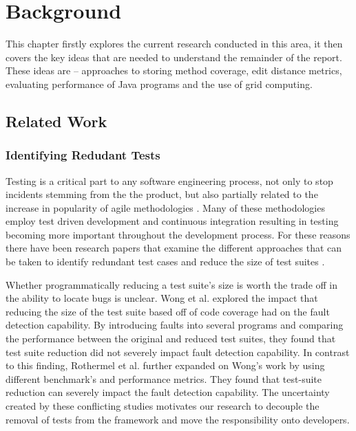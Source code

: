 \chapter{Background}\label{C:related}

This chapter firstly explores the current research conducted in this area, it then covers the key ideas that are needed to understand the remainder of the report. These ideas are -- approaches to storing method coverage, edit distance metrics, evaluating performance of Java programs and the use of grid computing.

\section{Related Work}
\label{relatedworkRef}
\subsection{Identifying Redudant Tests}
Testing is a critical part to any software engineering process, not only to stop incidents stemming from the the product, but also partially related to the increase in popularity of agile methodologies \cite{chaos}. Many of these methodologies employ test driven development and continuous integration resulting in testing becoming more important throughout the development process. For these reasons there have been research papers that examine the different approaches that can be taken to identify redundant test cases and reduce the size of test suites \cite{wong1995effect, wong1999test, rothermel1998empirical, rothermel2002empirical,koochakzadeh2009test,zhang2011empirical,li2008static}.

Whether programmatically reducing a test suite's size is worth the trade off in the ability to locate bugs is unclear.  Wong et al. \cite{wong1995effect, wong1999test} explored the impact that reducing the size of the test suite based off of code coverage had on the fault detection capability. By introducing faults into several programs and comparing the performance between the original and reduced test suites, they found that test suite reduction did not severely impact fault detection capability. In contrast to this finding, Rothermel et al. \cite{rothermel1998empirical, rothermel2002empirical} further expanded on Wong's work by using different benchmark's and performance metrics. They found that test-suite reduction can severely impact the fault detection capability. The uncertainty created by these conflicting studies motivates our research to decouple the removal of tests from the framework and move the responsibility onto developers. 

